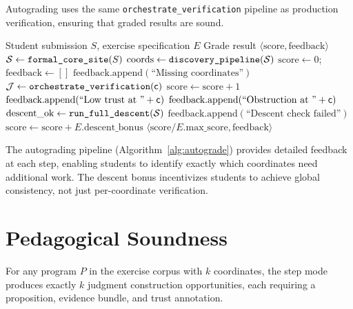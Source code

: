\documentclass[11pt]{article}
\begin{document}
Autograding uses the same \texttt{orchestrate\_verification} pipeline as
production verification, ensuring that graded results are sound.

\begin{algorithm}[t]
\caption{Autograding Pipeline}
\label{alg:autograde}
\begin{algorithmic}[1]
\REQUIRE Student submission $S$, exercise specification $E$
\ENSURE Grade result $\langle \text{score}, \text{feedback} \rangle$
\STATE $\mathcal{S} \gets \texttt{formal\_core\_site}(S)$
\STATE $\text{coords} \gets \texttt{discovery\_pipeline}(\mathcal{S})$
\STATE $\text{score} \gets 0$; $\text{feedback} \gets []$
  \STATE $\text{feedback}.\text{append}(\text{``Missing coordinates''})$
\ENDIF
{}
  \STATE $\mathcal{J} \gets \texttt{orchestrate\_verification}(\mathsf{c})$
    \STATE $\text{score} \gets \text{score} + 1$
  \ELSE
    \STATE $\text{feedback}.\text{append}(\text{``Low trust at ''} + \mathsf{c})$
  \ENDIF
    \STATE $\text{feedback}.\text{append}(\text{``Obstruction at ''} + \mathsf{c})$
  \ENDIF
\ENDFOR
\STATE $\text{descent\_ok} \gets \texttt{run\_full\_descent}(\mathcal{S})$
  \STATE $\text{feedback}.\text{append}(\text{``Descent check failed''})$
\ELSE
  \STATE $\text{score} \gets \text{score} + E.\text{descent\_bonus}$
\ENDIF
\RETURN $\langle \text{score} / E.\text{max\_score}, \text{feedback} \rangle$
\end{algorithmic}
\end{algorithm}

The autograding pipeline (Algorithm~\ref{alg:autograde}) provides detailed
feedback at each step, enabling students to identify exactly which
coordinates need additional work. The descent bonus incentivizes students to
achieve global consistency, not just per-coordinate verification.

\section{Pedagogical Soundness}\label{sec:ped-soundness}

\begin{theorem}\label{thm:exercise-complete}
For any program $P$ in the exercise corpus with $k$ coordinates, the step
mode produces exactly $k$ judgment construction opportunities, each requiring
a proposition, evidence bundle, and trust annotation.
\end{theorem}
\end{document}
